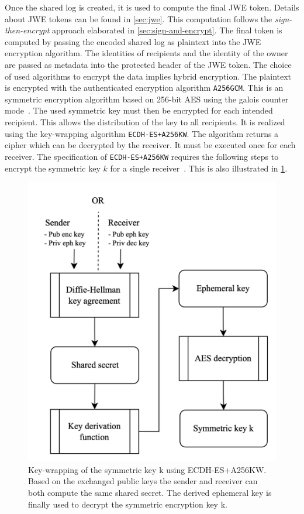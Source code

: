 \documentclass[../main.tex]{subfiles}
\begin{document}
Once the  shared log is created, it is used to compute the final JWE token.
Details about JWE tokens can be found in \cref{sec:jwe}.
This computation follows the \emph{sign-then-encrypt} approach elaborated in \cref{sec:sign-and-encrypt}.
The final token is computed by passing the encoded shared log as plaintext into the JWE encryption algorithm.
The identities of recipients and the identity of the owner are passed as metadata into the protected header of the JWE token.
The choice of used algorithms to encrypt the data implies hybrid encryption.
The plaintext is encrypted with the authenticated encryption algorithm \verb|A256GCM|.
This is an symmetric encryption algorithm based on 256-bit AES using the galois counter mode~.
The used symmetric key must then be encrypted for each intended recipient.
This allows the distribution of the key to all recipients.
It is realized using the key-wrapping algorithm \verb|ECDH-ES+A256KW|.
The algorithm returns a cipher which can be decrypted by the receiver.
It must be executed once for each receiver.
The specification of \verb|ECDH-ES+A256KW| requires the following steps to encrypt the symmetric key $k$ for a single receiver~\cite[100]{Barker2017}.
This is also illustrated in \cref{fig:key_wrapping}.
\begin{figure}[ht]
    \includegraphics[scale=0.2]{../img/07/key_wrapping.jpg}
    \centering
    \caption[Key-wrapping ECDH-ES+A256KW]{
        Key-wrapping of the symmetric key k using ECDH-ES+A256KW.
        Based on the exchanged public keys the sender and receiver can both compute the same shared secret.
        The derived ephemeral key is finally used to decrypt the symmetric encryption key k.}
    \label{fig:key_wrapping}
\end{figure}
\end{document}
